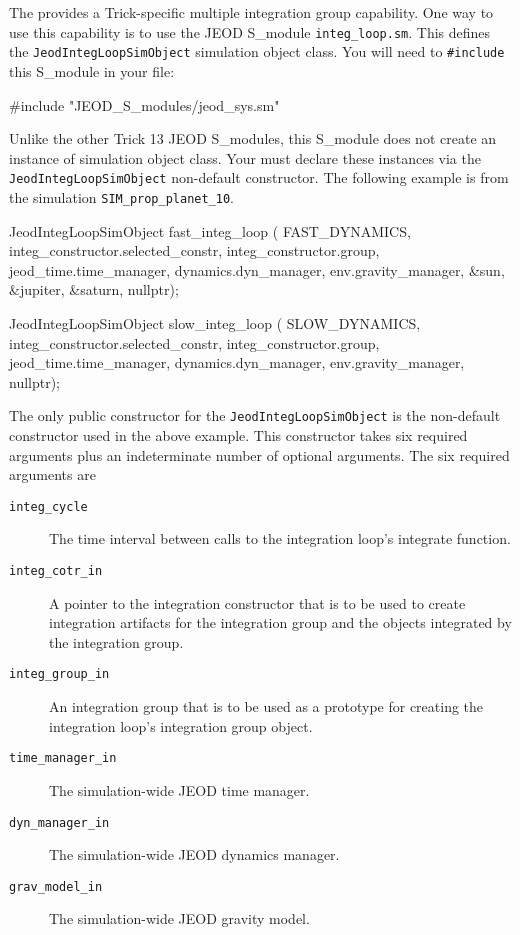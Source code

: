 The \ModelDesc provides a Trick-specific multiple integration group capability.
One way to use this capability is to use the JEOD S\_module
\verb|integ_loop.sm|. This defines the
\verb|JeodIntegLoopSimObject| simulation object class.
You will need to \verb|#include| this S\_module in your \Sdefine file:
\begin{codeblock}
#include "JEOD_S_modules/jeod_sys.sm"
\end{codeblock}
Unlike the other Trick 13 JEOD S\_modules,
this S\_module does not create an instance of simulation object class.
Your \Sdefine must declare these instances via
the  \verb|JeodIntegLoopSimObject| non-default constructor.
The following example is from the
 simulation \verb|SIM_prop_planet_10|.
\begin{codeblock}
JeodIntegLoopSimObject fast_integ_loop (
   FAST_DYNAMICS,
   integ_constructor.selected_constr, integ_constructor.group,
   jeod_time.time_manager, dynamics.dyn_manager, env.gravity_manager,
   &sun, &jupiter, &saturn, nullptr);

JeodIntegLoopSimObject slow_integ_loop (
   SLOW_DYNAMICS,
   integ_constructor.selected_constr, integ_constructor.group,
   jeod_time.time_manager, dynamics.dyn_manager, env.gravity_manager,
   nullptr);
\end{codeblock}

The only public constructor for the \verb|JeodIntegLoopSimObject| is the
non-default constructor used in the above example. This constructor takes
six required arguments plus an indeterminate number of optional arguments.
The six required arguments are\begin{description}
\item[{\tt integ\_cycle}]
The time interval between calls to the integration loop's integrate function.

\item[{\tt integ\_cotr\_in}]
A pointer to the integration constructor that is to be used to create
integration artifacts for the integration group and the objects integrated
by the integration group.

\item[{\tt integ\_group\_in}]
An integration group that is to be used as a prototype for creating the
integration loop's integration group object.

\item[{\tt time\_manager\_in}]
The simulation-wide JEOD time manager.

\item[{\tt dyn\_manager\_in}]
The simulation-wide JEOD dynamics manager.

\item[{\tt grav\_model\_in}]
The simulation-wide JEOD gravity model.
\end{description}

